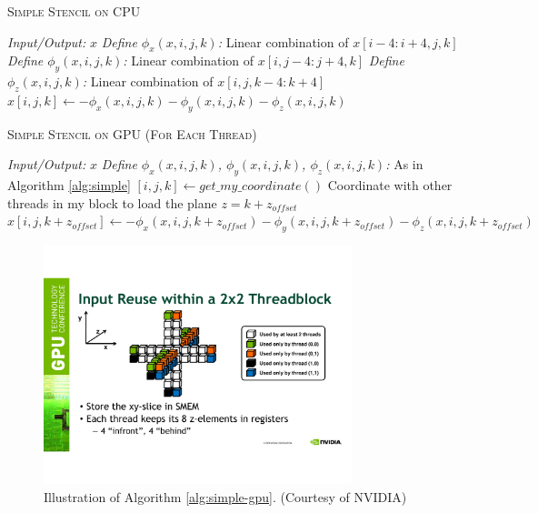 \begin{algorithm}
\caption{\textsc{Simple Stencil on CPU}}
\label{alg:simple}
\begin{algorithmic}[1]
\State \emph{Input/Output:} $x$
\State \emph{Define $\phi_x(x,i,j,k)$:} Linear combination of $x[i-4:i+4,j,k]$
\State \emph{Define $\phi_y(x,i,j,k)$:} Linear combination of $x[i,j-4:j+4,k]$
\State \emph{Define $\phi_z(x,i,j,k)$:} Linear combination of $x[i,j,k-4:k+4]$
	\State $x[i,j,k] \leftarrow -\phi_x(x,i,j,k) - \phi_y(x,i,j,k) - \phi_z(x,i,j,k)$
\EndFor
\end{algorithmic}
\end{algorithm}
\begin{algorithm}
\caption{\textsc{Simple Stencil on GPU (For Each Thread)}}
\label{alg:simple-gpu}
\begin{algorithmic}[1]
\State \emph{Input/Output:} $x$
\State \emph{Define $\phi_x(x,i,j,k)$, $\phi_y(x,i,j,k)$, $\phi_z(x,i,j,k)$:} As in Algorithm \ref{alg:simple}
\State $[i,j,k] \leftarrow get\_my\_coordinate()$
	\State Coordinate with other threads in my block to load the plane $z=k+z_{offset}$
	\State $x[i,j,k+z_{offset}] \leftarrow -\phi_x(x,i,j,k+z_{offset}) - \phi_y(x,i,j,k+z_{offset}) - \phi_z(x,i,j,k+z_{offset})$
\EndFor
\end{algorithmic}
\end{algorithm}
\begin{figure}[!t]
\centering
\includegraphics[width=0.8\textwidth]{./images/stencil-shared.pdf}
\caption{Illustration of Algorithm \ref{alg:simple-gpu}. (Courtesy of NVIDIA)}
\label{fig:25-point_stencil}
\end{figure}

